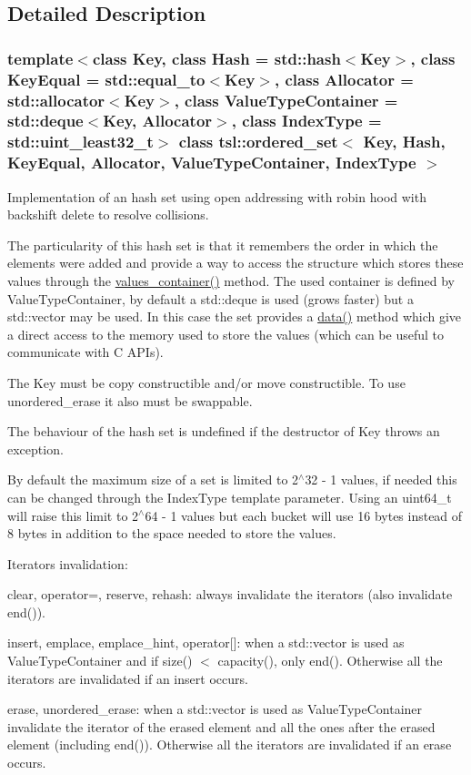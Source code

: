 \subsection{Detailed Description}
\subsubsection*{template$<$class Key, class Hash = std\+::hash$<$\+Key$>$, class Key\+Equal = std\+::equal\+\_\+to$<$\+Key$>$, class Allocator = std\+::allocator$<$\+Key$>$, class Value\+Type\+Container = std\+::deque$<$\+Key, Allocator$>$, class Index\+Type = std\+::uint\+\_\+least32\+\_\+t$>$\newline
class tsl\+::ordered\+\_\+set$<$ Key, Hash, Key\+Equal, Allocator, Value\+Type\+Container, Index\+Type $>$}

Implementation of an hash set using open addressing with robin hood with backshift delete to resolve collisions.

The particularity of this hash set is that it remembers the order in which the elements were added and provide a way to access the structure which stores these values through the \textquotesingle{}\mbox{\hyperlink{classtsl_1_1ordered__set_a1bc951514a5c4c29c14b6cf5177cf1ec}{values\+\_\+container()}}\textquotesingle{} method. The used container is defined by Value\+Type\+Container, by default a std\+::deque is used (grows faster) but a std\+::vector may be used. In this case the set provides a \textquotesingle{}\mbox{\hyperlink{classtsl_1_1ordered__set_a3ec9980b152c71a875fc4a4e1d7bb78c}{data()}}\textquotesingle{} method which give a direct access to the memory used to store the values (which can be useful to communicate with C A\+PI\textquotesingle{}s).

The Key must be copy constructible and/or move constructible. To use {\ttfamily unordered\+\_\+erase} it also must be swappable.

The behaviour of the hash set is undefined if the destructor of Key throws an exception.

By default the maximum size of a set is limited to 2$^\wedge$32 -\/ 1 values, if needed this can be changed through the Index\+Type template parameter. Using an {\ttfamily uint64\+\_\+t} will raise this limit to 2$^\wedge$64 -\/ 1 values but each bucket will use 16 bytes instead of 8 bytes in addition to the space needed to store the values.

Iterators invalidation\+:
\begin{DoxyItemize}
\item clear, operator=, reserve, rehash\+: always invalidate the iterators (also invalidate end()).
\item insert, emplace, emplace\+\_\+hint, operator\mbox{[}\mbox{]}\+: when a std\+::vector is used as Value\+Type\+Container and if size() $<$ capacity(), only end(). Otherwise all the iterators are invalidated if an insert occurs.
\item erase, unordered\+\_\+erase\+: when a std\+::vector is used as Value\+Type\+Container invalidate the iterator of the erased element and all the ones after the erased element (including end()). Otherwise all the iterators are invalidated if an erase occurs. 
\end{DoxyItemize}

